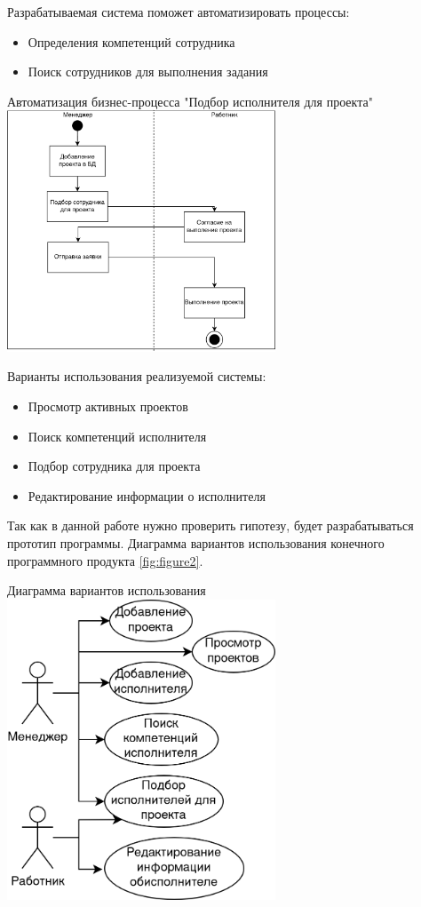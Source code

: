 \documentclass[PI,KR]{HSEUniversity}
\begin{document}
Разрабатываемая система поможет автоматизировать процессы:
\begin{itemize}
	\item Определения компетенций сотрудника
	\item Поиск сотрудников для выполнения задания
\end{itemize}
\begin{FIGURE}[h]{Автоматизация бизнес-процесса "Подбор исполнителя для проекта" \label{fig:figure1}}
	\includegraphics[width=0.6\textwidth]{img/Диаграмма Бизнес-процесса 1}
\end{FIGURE}
Варианты использования реализуемой системы:
\begin{itemize}
	\item Просмотр активных проектов
	\item Поиск компетенций исполнителя
	\item Подбор сотрудника для проекта
	\item Редактирование информации о исполнителя
\end{itemize}

Так как в данной работе нужно проверить гипотезу, будет разрабатываться прототип программы. Диаграмма вариантов использования конечного программного продукта \ref{fig:figure2}.
\begin{FIGURE}[h]{Диаграмма вариантов использования \label{fig:figure2}}
	\includegraphics[width=0.6\textwidth]{img/Диаграмма вариантов использования}
\end{FIGURE}
\end{document}
